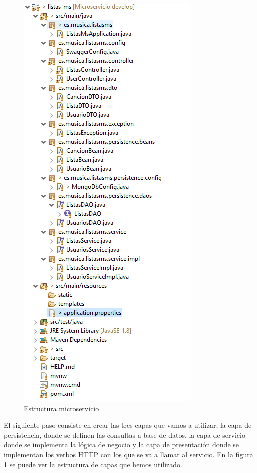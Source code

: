 \documentclass[12pt]{report} %
\begin{document}
\begin{figure}
	\centering
	\includegraphics[width=0.7\linewidth]{imagenes/estructuramicroservicio}
	\caption{Estructura microservicio}
	\label{fig:estructura-microservicio}
\end{figure}

El siguiente paso consiste en crear las tres capas que vamos a utilizar; la capa de persistencia, donde se definen las consultas a base de datos, la capa de servicio donde se implementa la lógica de negocio y la capa de presentación donde se implementan los verbos HTTP con los que se va a llamar al servicio. En la figura \ref{fig:estructura-microservicio} se puede ver la estructura de capas que hemos utilizado.
\end{document}
